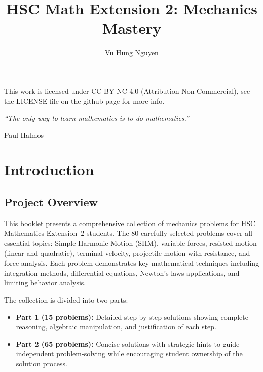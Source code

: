 \documentclass[12pt]{article}
\author{Vu Hung Nguyen}
\title{HSC Math Extension 2: Mechanics Mastery}
\date{}
\begin{document}


\newpage


\begingroup\small\noindent This work is licensed under CC BY-NC 4.0 (Attribution-Non-Commercial), see the LICENSE file on the github page for more info.\par\endgroup

\newpage
\thispagestyle{empty}
\vspace*{\fill}
\begin{center}
\itshape
``The only way to learn mathematics is to do mathematics.''

\vspace{1em}
\normalfont Paul Halmos
\end{center}
\vspace*{\fill}

\newpage
\tableofcontents
\newpage

\section{Introduction}

\subsection{Project Overview}
This booklet presents a comprehensive collection of mechanics problems for HSC Mathematics Extension~2 students. The 80 carefully selected problems cover all essential topics: Simple Harmonic Motion (SHM), variable forces, resisted motion (linear and quadratic), terminal velocity, projectile motion with resistance, and force analysis. Each problem demonstrates key mathematical techniques including integration methods, differential equations, Newton's laws applications, and limiting behavior analysis.

The collection is divided into two parts:
\begin{itemize}[leftmargin=*]
  \item \textbf{Part 1 (15 problems):} Detailed step-by-step solutions showing complete reasoning, algebraic manipulation, and justification of each step.
  \item \textbf{Part 2 (65 problems):} Concise solutions with strategic hints to guide independent problem-solving while encouraging student ownership of the solution process.
\end{itemize}
\end{document}

